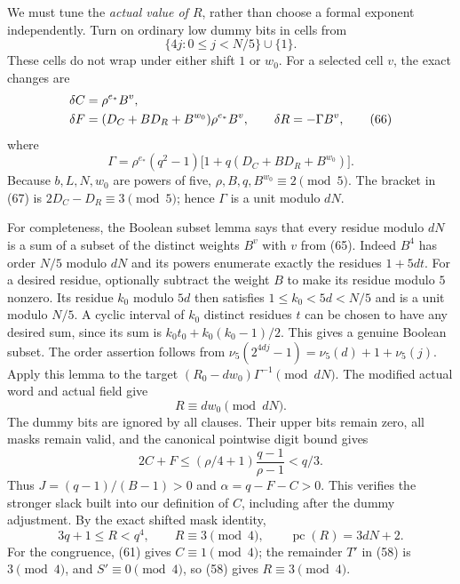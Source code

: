 \documentclass[11pt,a4paper]{article}
\theoremstyle{definition}
\theoremstyle{remark}
\newcommand{\pc}{\operatorname{pc}}
\begin{document}
We must tune the \emph{actual value of \(R\)}, rather than choose a
formal exponent independently. Turn on ordinary low dummy bits in
cells from
\[
 \{4j:0\le j<N/5\}\cup\{1\}. \tag{65}
\]
These cells do not wrap under either shift \(1\) or \(w_0\).
For a selected cell \(v\), the exact changes are
\begin{align}
 \delta C&=\rho^{e_*}B^v,\notag\\
 \delta F&=(D_C+BD_R+B^{w_0})\rho^{e_*}B^v,\qquad
 \delta R=-\Gamma B^v, \tag{66}
\end{align}
where
\[
 \Gamma=\rho^{e_*}(q^2-1)
         \bigl[1+q(D_C+BD_R+B^{w_0})\bigr]. \tag{67}
\]
Because \(b,L,N,w_0\) are powers of five,
\(\rho,B,q,B^{w_0}\equiv2\pmod5\).
The bracket in (67) is \(2D_C-D_R\equiv3\pmod5\);
hence \(\Gamma\) is a unit modulo \(dN\).

For completeness, the Boolean subset lemma \cite{fiveadic} says
that every residue modulo \(dN\) is a sum of a subset of the
distinct weights \(B^v\) with \(v\) from (65).
Indeed \(B^4\) has order \(N/5\)
modulo \(dN\) and its powers enumerate exactly the residues
\(1+5dt\). For a desired residue, optionally subtract the weight
\(B\) to make its residue modulo \(5\) nonzero. Its residue
\(k_0\) modulo \(5d\) then satisfies \(1\le k_0<5d<N/5\)
and is a unit modulo \(N/5\). A cyclic interval of \(k_0\)
distinct residues \(t\) can be chosen to have any desired sum,
since its sum is
\(k_0t_0+k_0(k_0-1)/2\). This gives a genuine Boolean subset.
The order assertion follows from
\(\nu_5(2^{4dj}-1)=\nu_5(d)+1+\nu_5(j)\).
Apply this lemma to the target
\((R_0-dw_0)\Gamma^{-1}\pmod{dN}\).
The modified actual word and actual field give
\[
 R\equiv dw_0\pmod{dN}. \tag{68}
\]
The dummy bits are ignored by all clauses. Their upper bits remain
zero, all masks remain valid, and the canonical pointwise digit
bound gives
\[
 2C+F\le(\rho/4+1)\frac{q-1}{\rho-1}<q/3. \tag{69}
\]
Thus \(J=(q-1)/(B-1)>0\) and
\(\alpha=q-F-C>0\). This verifies the stronger slack built into
our definition of \(C\), including after the dummy adjustment.
By the exact shifted mask identity,
\[
 3q+1\le R<q^4,\qquad R\equiv3\pmod4,\qquad
 \pc(R)=3dN+2. \tag{70}
\]
For the congruence, (61) gives \(C\equiv1\pmod4\);
the remainder \(T'\) in (58) is \(3\pmod4\), and
\(S'\equiv0\pmod4\), so (58) gives \(R\equiv3\pmod4\).
\end{document}
